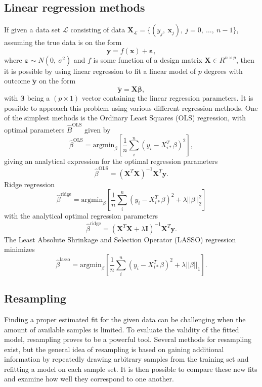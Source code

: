 \documentclass[a4paper, 10pt]{article}
\begin{document}
\begin{multicols}{2}
\subsection{Linear regression methods}
If given a data set $\mathcal{L}$ consisting of data $\bm{X}_\mathcal{L} = \{(y_j,\ \bm{x}_j),\ j=0,\ \dots,\ n-1\}$, assuming the true data is on the form
\[
\bm{y} = f(\bm{x})+ \bm{\varepsilon} ,
\]
where $\bm{\varepsilon} \sim N(0,\ \sigma ^2)$ and $f$ is some function of a design matrix $\bm{X}\in R^{n\times p}$, then it is possible by using linear regression to fit a linear model of $p$ degrees with outcome $\bm{\tilde{y}}$ on the form
\[
\bm{\tilde{y}} = \bm{X}\bm{\beta},
\]
with $\bm{\beta}$ being a $(p\times 1)$ vector containing the linear regression parameters.
It is possible to approach this problem using various different regression methods. One of the simplest methods is the Ordinary Least Squares (OLS) regression, with optimal  parameters $\hat{B}^\text{OLS}$ given by
\begin{equation}
    \hat{\beta}^\text{OLS} = \text{argmin}_{ {\beta} } \left[ \frac{1}{n} \sum_i^n (y_i - X_{i*}^T \beta)^2 \right],
    \label{eq:argminbeta_OLS}
\end{equation}
giving an analytical expression for the optimal regression parameters
\begin{equation}
    \hat{\beta}^{\text{OLS}} = (\bm{X}^T\bm{X})^{-1} \bm{X}^T \bm{y}.
    \label{eq:beta_OLS}
\end{equation}
Ridge regression
\begin{equation}
    \hat{\beta}^\text{ridge} = \text{argmin}_\beta \left[ \frac{1}{n}\sum_i^n(y_i-X_{i*}^T\beta)^2 + \lambda ||\beta||_2^2  \right]
    \label{eq:argminbeta_ridge}
\end{equation}
with the analytical optimal regression parameters
\begin{equation}
    \hat{\beta}^\text{ridge} = (\bm{X}^T\bm{X} +\lambda \bm{I})^{-1} \bm{X}^T \bm{y}.
    \label{eq:beta_ridge}
\end{equation}
The Least Absolute Shrinkage and Selection Operator (LASSO) regression minimizes
\begin{equation}
    \hat{\beta}^\text{lasso} =  \text{argmin}_\beta \left[  \frac{1}{n}\sum_i^n(y_i-X_{i*}^T\beta)^2 + \lambda ||\beta||_1  \right].
    \label{eq:argminbeta_lasso}
\end{equation}

\subsection{Resampling}
Finding a proper estimated fit for the given data can be challenging when the amount of available samples is limited. To evaluate the validity of the fitted model, resampling proves to be a powerful tool. Several methods for resampling exist, but the general idea of resampling is based on gaining additional information by repeatedly drawing arbitrary samples from the training set and refitting a model on each sample set. It is then possible to compare these new fits and examine how well they correspond to one another.


\end{multicols}
\end{document}
